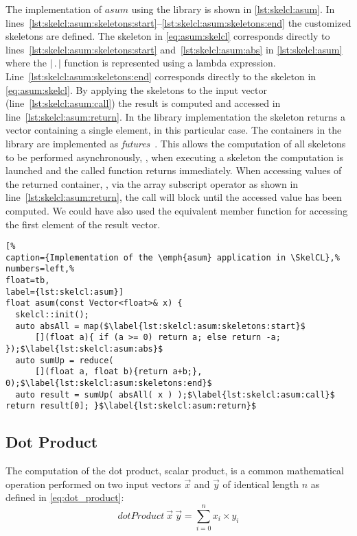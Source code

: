 The implementation of $asum$ using the \SkelCL library is shown in \autoref{lst:skelcl:asum}.
In lines~\ref{lst:skelcl:asum:skeletons:start}--\ref{lst:skelcl:asum:skeletons:end} the customized skeletons are defined.
The \map skeleton in \autoref{eq:asum:skelcl} corresponds directly to lines~\ref{lst:skelcl:asum:skeletons:start} and~\ref{lst:skelcl:asum:abs} in \autoref{lst:skelcl:asum} where the $|\, .\, |$ function is represented using a \Cpp lambda expression.
Line~\ref{lst:skelcl:asum:skeletons:end} corresponds directly to the \reduce skeleton in \autoref{eq:asum:skelcl}.
By applying the skeletons to the input vector (line~\ref{lst:skelcl:asum:call}) the result is computed and accessed in line~\ref{lst:skelcl:asum:return}.
In the \SkelCL library implementation the \reduce skeleton returns a vector containing a single element,  in this particular case.
The containers in the \SkelCL library are implemented as \emph{futures}~\cite{HewittBa1977,FriedmanWi1978}.
This allows the computation of all skeletons to be performed asynchronously, \ie, when executing a skeleton the computation is launched and the called function returns immediately.
When accessing values of the returned container, \eg, via the array subscript operator as shown in line~\ref{lst:skelcl:asum:return}, the call will block until the accessed value has been computed.
We could have also used the equivalent  member function for accessing the first element of the result vector.

\begin{lstlisting}[%                                                             
caption={Implementation of the \emph{asum} application in \SkelCL},%
numbers=left,%
float=tb,
label={lst:skelcl:asum}]
float asum(const Vector<float>& x) {
  skelcl::init();
  auto absAll = map($\label{lst:skelcl:asum:skeletons:start}$
      [](float a){ if (a >= 0) return a; else return -a; });$\label{lst:skelcl:asum:abs}$
  auto sumUp = reduce(
      [](float a, float b){return a+b;}, 0);$\label{lst:skelcl:asum:skeletons:end}$
  auto result = sumUp( absAll( x ) );$\label{lst:skelcl:asum:call}$ return result[0]; }$\label{lst:skelcl:asum:return}$
\end{lstlisting}


\subsection*{Dot Product}
\label{sec:dot}
The computation of the dot product, \aka scalar product, is a common mathematical operation performed on two input vectors $\vec{x}$ and $\vec{y}$ of identical length $n$ as defined in \autoref{eq:dot_product}:
\begin{equation}
  dotProduct\ \vec{x}\ \vec{y} = \sum_{i=0}^{n} x_i \times y_i
  \label{eq:dot_product}
\end{equation}


